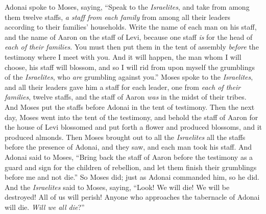 \begin{biblechapter} %
 Adonai spoke to Moses, saying,
\verse “Speak to the \textit{Israelites}, and take from among them twelve staffs, \textit{a staff from each family} from among all their leaders according to their families’ households. Write the name of each man on his staff,
\verse and the name of Aaron on the staff of Levi, because one staff \textit{is} for the head of \textit{each of} \textit{their families}.
\verse You must then put them in the tent of assembly \textit{before} the testimony where I meet with you.
\verse And it will happen, the man whom I will choose, his staff will blossom, and so I will rid from upon myself the grumblings of the \textit{Israelites}, who \textit{are} grumbling against you.”
\verse Moses spoke to the \textit{Israelites}, and all their leaders gave him a staff for each leader, one from \textit{each of their families}, twelve staffs, and the staff of Aaron \textit{was} in the midst of their tribes.
\verse And Moses put the staffs before Adonai in the tent of testimony.
\verse Then the next day, Moses went into the tent of the testimony, and behold the staff of Aaron for the house of Levi blossomed and put forth a flower and produced blossoms, and it produced almonds.
\verse Then Moses brought out to all the \textit{Israelites} all the staffs before the presence of Adonai, and they saw, and each man took his staff.
\verse And Adonai said to Moses, “Bring back the staff of Aaron before the testimony as a guard and sign for the children of rebellion, and let them finish their grumblings before me and not die.”
\verse So Moses did; just as Adonai commanded him, so he did.
\verse And the \textit{Israelites} said to Moses, saying, “Look! We will die! We will be destroyed! All of us will perish!
\verse Anyone who approaches the tabernacle of Adonai will die. \textit{Will we all die}?”
\end{biblechapter}

